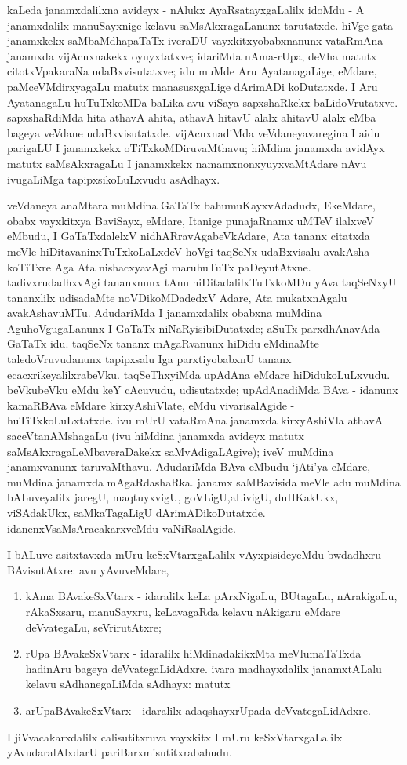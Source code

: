kaLeda janamxdalilxna avideyx - nAlukx AyaRsatayxgaLalilx idoMdu - A janamxdalilx manuSayxnige kelavu saMsAkxragaLanunx tarutatxde. hiVge gata janamxkekx saMbaMdhapaTaTx iveraDU vayxkitxyobabxnanunx vataRmAna janamxda vijAcnxnakekx oyuyxtatxve; idariMda nAma-rUpa, deVha matutx citotxVpakaraNa udaBxvisutatxve; idu muMde Aru AyatanagaLige, eMdare, paMceVMdirxyagaLu matutx manasusxgaLige dArimADi koDutatxde. I Aru AyatanagaLu huTuTxkoMDa baLika avu viSaya sapxshaRkekx baLidoVrutatxve. sapxshaRdiMda hita athavA ahita, athavA hitavU alalx ahitavU alalx eMba bageya veVdane udaBxvisutatxde. vijAcnxnadiMda veVdaneyavaregina I aidu parigaLU I janamxkekx oTiTxkoMDiruvaMthavu; hiMdina janamxda avidAyx matutx saMsAkxragaLu I janamxkekx namamxnonxyuyxvaMtAdare nAvu ivugaLiMga tapipxsikoLuLxvudu asAdhayx.

veVdaneya anaMtara muMdina GaTaTx bahumuKayxvAdadudx, EkeMdare, obabx \hbox{vayxkitxya} BaviSayx, eMdare, Itanige punajaRnamx uMTeV ilalxveV eMbudu, I GaTaTxdalelxV nidhARra\-vAgabeVkAdare, Ata tananx citatxda meVle hiDitavaninxTuTxkoLaLxdeV hoVgi taqSeNx udaBxvisalu avakAsha koTiTxre Aga Ata nishacxyavAgi maruhuTuTx paDeyutAtxne. tadivxrudadhxvAgi \hbox{tananxnunx} tAnu hiDitadalilxTuTxkoMDu yAva taqSeNxyU tananxlilx udisadaMte noVDikoMDadedxV Adare, Ata mukatxnAgalu avakAshavuMTu. AdudariMda I janamxdalilx obabxna muMdina AguhoVgugaLanunx I GaTaTx niNaRyisibiDutatxde; aSuTx parxdhAnavAda GaTaTx idu. taqSeNx tananx mAgaRvanunx hiDidu eMdinaMte taledoVruvudanunx tapipxsalu Iga parxtiyobabxnU tananx ecacxrikeyalilxrabeVku. taqSeThxyiMda upAdAna eMdare hiDidukoLuLxvudu. beVku\break beVku eMdu keY cAcuvudu, udisutatxde; upAdAnadiMda BAva - idanunx kamaR\-BAva eMdare kirxyAshiVlate, eMdu vivarisalAgide - huTiTxkoLuLxtatxde. ivu mUrU vataRmAna janamxda kirxyAshiVla athavA saceVtanAMshagaLu (ivu hiMdina janamxda avideyx matutx saMsAkxragaLeMbaveraDakekx saMvAdigaLAgive); iveV muMdina janamxvanunx taruvaMthavu. AdudariMda BAva eMbudu `jAti'ya eMdare, muMdina janamxda mAgaRdashaRka. janamx saMBavisida meVle adu muMdina bALuveyalilx jaregU, maqtuyxvigU, \hbox{goVLigU},\break aLivigU, duHKakUkx, viSAdakUkx, saMkaTagaLigU dArimADikoDutatxde. idanenxV\break saMsAra\-cakarxveMdu vaNiRsalAgide.

I bALuve asitxtavxda mUru keSxVtarxgaLalilx vAyxpisideyeMdu bwdadhxru BAvisutAtxre: avu yAvuveMdare, 
\begin{enumerate}
\renewcommand{\theenumi}{\arabic{enumi}}
\renewcommand{\labelenumi}{(\theenumi)}
\item kAma BAvakeSxVtarx - idaralilx keLa pArxNigaLu, BUtagaLu, nArakigaLu, rAkaSxsaru, manuSayxru, keLavagaRda kelavu nAkigaru eMdare deVvategaLu, seVrirutAtxre;
\item rUpa BAvakeSxVtarx - idaralilx hiMdinadakikxMta meVlumaTaTxda hadinAru bageya deVvategaLidAdxre. ivara madhayxdalilx janamxtALalu kelavu sAdhanegaLiMda sAdhayx: matutx 
\item arUpaBAvakeSxVtarx - idaralilx adaqshayxrUpada deVvategaLidAdxre.
\end{enumerate}
I jiVvacakarxdalilx calisutitxruva vayxkitx I mUru keSxVtarxgaLalilx yAvudaralAlxdarU pariBarxmisutitxrabahudu.

